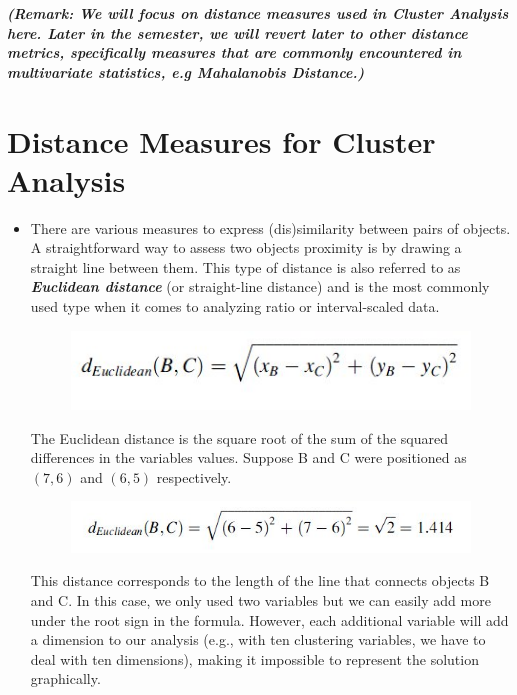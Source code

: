 \documentclass[a4paper,12pt]{article}
\begin{document}
\noindent \textbf{\textit{(Remark: We will focus on distance measures used in Cluster Analysis here. Later in the semester, we will revert later to other distance metrics, specifically measures that are commonly encountered in multivariate statistics, e.g Mahalanobis Distance.)}}
\section*{Distance Measures for Cluster Analysis}
\begin{itemize}
\item There are various measures to express (dis)similarity between pairs of objects.
A straightforward way to assess two objects proximity is by drawing a straight line
between them. This type of distance is also referred to as
\textbf{\textit{Euclidean distance}} (or straight-line distance) and is the most commonly used type
when it comes to analyzing ratio or interval-scaled data.
\begin{figure}[h!]
	\begin{center}
		\includegraphics[scale=0.6]{images/EuclidDistance1.jpg}
	\end{center}
\end{figure}

The Euclidean distance is the square root of the sum of the squared differences in
the variables values. Suppose B and C were positioned as $(7,6)$ and $(6,5)$ respectively.
\begin{figure}[h!]
	\begin{center}
		\includegraphics[scale=0.6]{images/EuclidDistance2.jpg}
	\end{center}
\end{figure}

This distance corresponds to the length of the line that connects objects B and C.
In this case, we only used two variables but we can easily add more under the root
sign in the formula. However, each additional variable will add a dimension to our
analysis (e.g., with ten clustering variables, we have to deal with ten
dimensions), making it impossible to represent the solution graphically.


\end{itemize}
\end{document}

